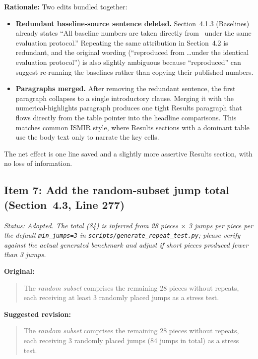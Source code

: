 \documentclass{article}
\begin{document}
\textbf{Rationale:}
Two edits bundled together:
\begin{itemize}
    \item \textbf{Redundant baseline-source sentence deleted.} Section~4.1.3 (Baselines) already states ``All baseline numbers are taken directly from~\cite{henkel2021real} under the same evaluation protocol.'' Repeating the same attribution in Section~4.2 is redundant, and the original wording (``reproduced from \ldots under the identical evaluation protocol'') is also slightly ambiguous because ``reproduced'' can suggest re-running the baselines rather than copying their published numbers.
    \item \textbf{Paragraphs merged.} After removing the redundant sentence, the first paragraph collapses to a single introductory clause. Merging it with the numerical-highlights paragraph produces one tight Results paragraph that flows directly from the table pointer into the headline comparisons. This matches common ISMIR style, where Results sections with a dominant table use the body text only to narrate the key cells.
\end{itemize}
The net effect is one line saved and a slightly more assertive Results section, with no loss of information.

\subsection*{Item 7: Add the random-subset jump total (Section~4.3, Line 277)}

\textit{Status: Adopted. The total (84) is inferred from 28 pieces $\times$ 3 jumps per piece per the default \texttt{min\_jumps=3} in \texttt{scripts/generate\_repeat\_test.py}; please verify against the actual generated benchmark and adjust if short pieces produced fewer than 3 jumps.}

\textbf{Original:}
\begin{quote}
The \emph{random subset} comprises the remaining 28 pieces without repeats, each receiving at least 3 randomly placed jumps as a stress test.
\end{quote}

\textbf{Suggested revision:}
\begin{quote}
The \emph{random subset} comprises the remaining 28 pieces without repeats, each receiving 3 randomly placed jumps (84 jumps in total) as a stress test.
\end{quote}
\end{document}
